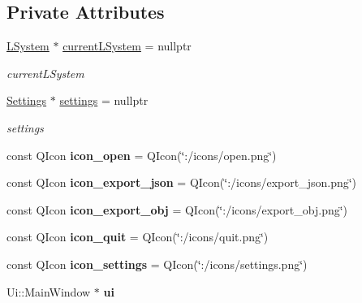 \subsection*{Private Attributes}
\begin{DoxyCompactItemize}
\item 
\mbox{\label{classMainWindow_a1db6e29a5428a2a7d0609c35cb682418}} 
\hyperlink{classLSystem}{L\+System} $\ast$ \hyperlink{classMainWindow_a1db6e29a5428a2a7d0609c35cb682418}{current\+L\+System} = nullptr
\begin{DoxyCompactList}\small\item\em current\+L\+System \end{DoxyCompactList}\item 
\mbox{\label{classMainWindow_a914d53c489b015b0bee55448a76b163e}} 
\hyperlink{classSettings}{Settings} $\ast$ \hyperlink{classMainWindow_a914d53c489b015b0bee55448a76b163e}{settings} = nullptr
\begin{DoxyCompactList}\small\item\em settings \end{DoxyCompactList}\item 
\mbox{\label{classMainWindow_a30be000cc68300f1d3d3eb2820cd1b60}} 
const Q\+Icon {\bfseries icon\+\_\+open} = Q\+Icon(\char`\"{}\+:/icons/open.\+png\char`\"{})
\item 
\mbox{\label{classMainWindow_ae5811a7e92a57393ce6dde3158594c75}} 
const Q\+Icon {\bfseries icon\+\_\+export\+\_\+json} = Q\+Icon(\char`\"{}\+:/icons/export\+\_\+json.\+png\char`\"{})
\item 
\mbox{\label{classMainWindow_ab45147776ace3eb465a039ee163e904e}} 
const Q\+Icon {\bfseries icon\+\_\+export\+\_\+obj} = Q\+Icon(\char`\"{}\+:/icons/export\+\_\+obj.\+png\char`\"{})
\item 
\mbox{\label{classMainWindow_ac21468e4e96297926656e1e30285bc77}} 
const Q\+Icon {\bfseries icon\+\_\+quit} = Q\+Icon(\char`\"{}\+:/icons/quit.\+png\char`\"{})
\item 
\mbox{\label{classMainWindow_a622701477c48eea4df780d75e8a0695c}} 
const Q\+Icon {\bfseries icon\+\_\+settings} = Q\+Icon(\char`\"{}\+:/icons/settings.\+png\char`\"{})
\item 
\mbox{\label{classMainWindow_a35466a70ed47252a0191168126a352a5}} 
Ui\+::\+Main\+Window $\ast$ {\bfseries ui}
\end{DoxyCompactItemize}


